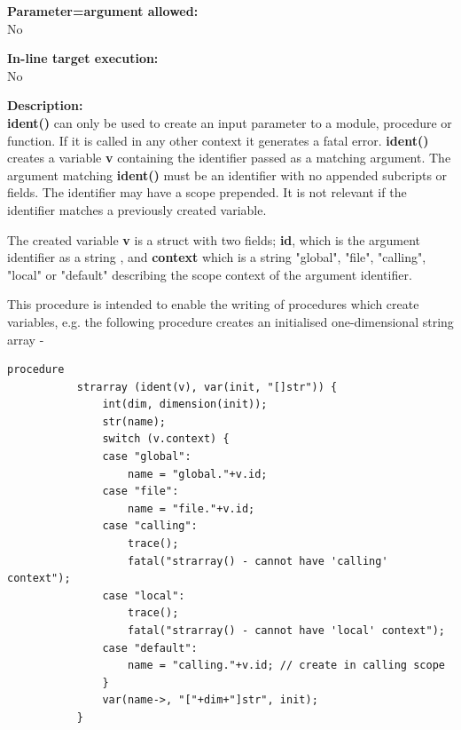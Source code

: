         {\bf Parameter=argument allowed:} \\
        No
        
        {\bf In-line target execution:} \\
        No
        
        {\bf Description:} \\
        {\bf ident()} can only be used to create an input parameter to a module,
        procedure or function. If it is called in any other context it generates a
        fatal error. {\bf ident()} creates a variable {\bf v} containing the
        identifier passed as a matching argument. The argument matching {\bf
        ident()} must be an identifier with no appended subcripts or fields. The
        identifier may have a scope prepended. It is not relevant if the identifier
        matches a previously created variable.
        
        The created variable {\bf v} is a struct with two fields; {\bf id}, which
        is the argument identifier as a string , and {\bf context} which is a
        string "global", "file",  "calling", "local" or "default"
        describing the scope context of the argument identifier.
        
        This procedure is intended to enable the writing of procedures
        which create variables, e.g. the following procedure creates an
        initialised one-dimensional string array -
        \begin{lstlisting}[gobble=8, language=threepl]
           procedure
           strarray (ident(v), var(init, "[]str")) {
               int(dim, dimension(init));
               str(name);
               switch (v.context) {
               case "global":
                   name = "global."+v.id;
               case "file":
                   name = "file."+v.id;
               case "calling":
                   trace();
                   fatal("strarray() - cannot have 'calling' context");
               case "local":
                   trace();
                   fatal("strarray() - cannot have 'local' context");
               case "default":
                   name = "calling."+v.id; // create in calling scope
               }
               var(name->, "["+dim+"]str", init);
           }
        \end{lstlisting}
        
